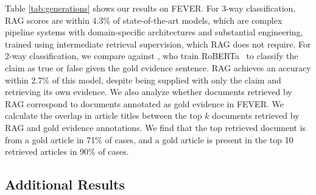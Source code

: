 Table \ref{tab:generations} shows our results on FEVER. For 3-way classification, RAG scores are within 4.3\% of state-of-the-art models, which are complex pipeline systems with domain-specific architectures and substantial engineering, trained using intermediate retrieval supervision, which RAG does not require. For 2-way classification, we compare against \citet{Thorne2020AvoidingCF}, who train RoBERTa~\cite{liu-etal-2019-robust} to classify the claim as true or false given the gold evidence sentence. RAG achieves an accuracy within 2.7\% of this model, despite being supplied with only the claim and retrieving its own evidence.
We also analyze whether documents retrieved by RAG correspond to documents annotated as gold evidence in FEVER. 
We calculate the overlap in article titles between the top $k$ documents retrieved by RAG and gold evidence annotations.
We find that the top retrieved document is from a gold article in 71\% of cases, and a gold article is present in the top 10 retrieved articles in 90\% of cases.

\subsection{Additional Results}
\label{sec:gen_div}

